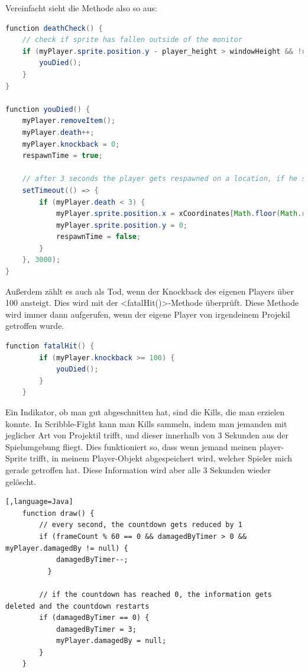 Vereinfacht sieht die Methode also so aus:

\begin{lstlisting}[caption=Überprüfung nach Toden,language=Java,label=lst:impl:deathCheck]
function deathCheck() {
    // check if sprite has fallen outside of the monitor
    if (myPlayer.sprite.position.y - player_height > windowHeight && !respawnTime) {
        youDied();
    }
}

function youDied() {
    myPlayer.removeItem();
    myPlayer.death++;
    myPlayer.knockback = 0;
    respawnTime = true;

    // after 3 seconds the player gets respawned on a location, if he still has at least one live left
    setTimeout(() => {
        if (myPlayer.death < 3) {
            myPlayer.sprite.position.x = xCoordinates[Math.floor(Math.random() * xCoordinates.length)];
            myPlayer.sprite.position.y = 0;
            respawnTime = false;
        }
    }, 3000);
}
\end{lstlisting}

Außerdem zählt es auch als Tod, wenn der Knockback des eigenen Players über 100 ansteigt. Dies wird mit der <fatalHit()>-Methode überprüft.
Diese Methode wird immer dann aufgerufen, wenn der eigene Player von irgendeinem Projekil getroffen wurde.
\begin{lstlisting}[caption=Fatal Hit,language=Java,label=lst:impl:fatalHit]
    function fatalHit() {
        if (myPlayer.knockback >= 100) {
            youDied();
        }
    } 
\end{lstlisting}
Ein Indikator, ob man gut abgeschnitten hat, sind die Kills, die man erzielen konnte.
In Scribble-Fight kann man Kills sammeln, indem man jemanden mit jeglicher Art von Projektil trifft, und dieser innerhalb von 3 Sekunden aus der Spielumgebung fliegt. 
Dies funktioniert so, dass wenn jemand meinen player-Sprite trifft, in meinem Player-Objekt abgespeichert wird, welcher Spieler mich gerade getroffen hat. 
Diese Information wird aber alle 3 Sekunden wieder gelöscht. 

\begin{lstlisting}[,language=Java]
    function draw() {
        // every second, the countdown gets reduced by 1
        if (frameCount % 60 == 0 && damagedByTimer > 0 && myPlayer.damagedBy != null) {
            damagedByTimer--;
          }
      
        // if the countdown has reached 0, the information gets deleted and the countdown restarts
        if (damagedByTimer == 0) {
            damagedByTimer = 3;
            myPlayer.damagedBy = null;
        }
    }
   
\end{lstlisting}


